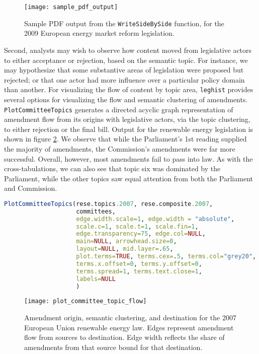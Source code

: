 \documentclass[11pt]{article}
\begin{document}
\begin{figure}[ht]
  \centering
  \texttt{[image: sample\_pdf\_output]}
  \label{fig:pdf-output}
  \caption{Sample PDF output from the \texttt{WriteSideBySide} function, for the 2009 European energy market reform legislation.}
\end{figure}

 
Second, analysts may wish to observe how content moved from
legislative actors to either acceptance or rejection, based on the
semantic topic. For instance, we may hypothesize that some substantive
areas of legislation were proposed but rejected; or that one actor had
more influence over a particular policy domain than another. For
visualizing the flow of content by topic area, \texttt{leghist}
provides several options for visualizing the flow and semantic
clustering of amendments. \texttt{PlotCommitteeTopics} generates a
directed acyclic graph representation of amendment flow from its
origins with legislative actors, via the topic clustering, to either
rejection or the final bill. Output for the renewable energy
legislation is shown in figure \ref{fig:amend-flow}. We observe that
while the Parliament's 1st reading supplied the majority of
amendments, the Commission's amendments were far more
successful. Overall, however, most amendments fail to pass into
law. As with the cross-tabulations, we can also see that topic six was
dominated by the Parliament, while the other topics saw equal
attention from both the Parliament and Commission.

\begin{lstlisting}[language=R, numbers=none]
PlotCommitteeTopics(rese.topics.2007, rese.composite.2007,
                    committees,
                    edge.width.scale=1, edge.width = "absolute",
                    scale.c=1, scale.t=1, scale.fin=1,
                    edge.transparency=75, edge.col=NULL,
                    main=NULL, arrowhead.size=0, 
                    layout=NULL, mid.layer=.65, 
                    plot.terms=TRUE, terms.cex=.5, terms.col="grey20",
                    terms.x.offset=0, terms.y.offset=0, 
                    terms.spread=1, terms.text.close=1,
                    labels=NULL
                    )
\end{lstlisting}

\begin{figure}[ht]
  \centering
  \texttt{[image: plot\_committee\_topic\_flow]}
  \caption{Amendment origin, semantic clustering, and destination for the 2007 European Union renewable energy law. Edges represent amendment flow from sources to destination. Edge width reflects the share of amendments from that source bound for that destination. }
  \label{fig:amend-flow}
\end{figure}
\end{document}
